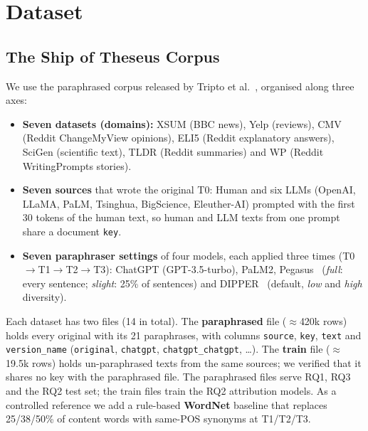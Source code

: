 \section{Dataset}

\subsection{The Ship of Theseus Corpus}

We use the paraphrased corpus released by Tripto et al.~\cite{tripto2024ship}, organised along
three axes:
\begin{itemize}[noitemsep,topsep=2pt,leftmargin=*]
  \item \textbf{Seven datasets (domains):} XSUM (BBC news), Yelp (reviews), CMV (Reddit
        ChangeMyView opinions), ELI5 (Reddit explanatory answers), SciGen (scientific text),
        TLDR (Reddit summaries) and WP (Reddit WritingPrompts stories).
  \item \textbf{Seven sources} that wrote the original T0: Human and six LLMs (OpenAI, LLaMA,
        PaLM, Tsinghua, BigScience, Eleuther-AI) prompted with the first 30 tokens of the human
        text, so human and LLM texts from one prompt share a document \texttt{key}.
  \item \textbf{Seven paraphraser settings} of four models, each applied three times
        (T0$\to$T1$\to$T2$\to$T3): ChatGPT (GPT-3.5-turbo), PaLM2, Pegasus~\cite{zhang2020pegasus}
        (\emph{full}: every sentence; \emph{slight}: 25\% of sentences) and
        DIPPER~\cite{krishna2023paraphrasing} (default, \emph{low} and \emph{high} diversity).
\end{itemize}
Each dataset has two files (14 in total). The \textbf{paraphrased} file
($\approx$420k rows) holds every original with its 21 paraphrases, with columns
\texttt{source}, \texttt{key}, \texttt{text} and \texttt{version\_name}
(\texttt{original}, \texttt{chatgpt}, \texttt{chatgpt\_chatgpt}, \ldots). The \textbf{train} file
($\approx$19.5k rows) holds un-paraphrased texts from the same sources; we verified that it shares
no key with the paraphrased file. The paraphrased files serve RQ1, RQ3 and the RQ2 test set; the
train files train the RQ2 attribution models. As a controlled reference we add a rule-based
\textbf{WordNet} baseline that replaces 25/38/50\% of content words with same-POS synonyms at
T1/T2/T3.

